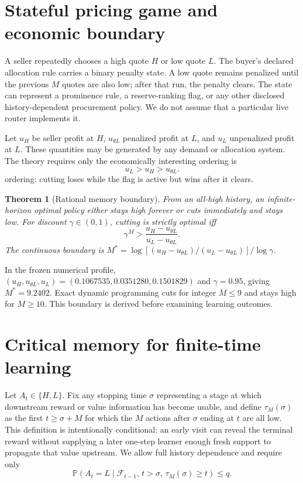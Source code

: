 \documentclass[10pt,twocolumn]{article}
\newtheorem{theorem}{Theorem}
\newcommand{\Prb}{\mathbb{P}}
\begin{document}
\section{Stateful pricing game and economic boundary}

A seller repeatedly chooses a high quote $H$ or low quote $L$.  The buyer's
declared allocation rule carries a binary penalty state.  A low quote remains
penalized until the previous $M$ quotes are also low; after that run, the
penalty clears.  The state can represent a prominence rule, a reserve-ranking
flag, or any other disclosed history-dependent procurement policy.  We do not
assume that a particular live router implements it.

Let $u_H$ be seller profit at $H$, $u_{\theta L}$ penalized profit at $L$, and
$u_L$ unpenalized profit at $L$.  These quantities may be generated by any
demand or allocation system.  The theory requires only the economically
interesting
ordering is
\begin{equation}
  u_L>u_H>u_{\theta L}.
  \label{eq:ordering}
\end{equation}
ordering: cutting loses while the flag is active but wins after it clears.

\begin{theorem}[Rational memory boundary]
From an all-high history, an infinite-horizon optimal policy either stays high
forever or cuts immediately and stays low.  For discount $\gamma\in(0,1)$,
cutting is strictly optimal iff
\begin{equation}
 \gamma^M>
 \frac{u_H-u_{\theta L}}{u_L-u_{\theta L}}.
 \label{eq:rational-boundary}
\end{equation}
The continuous boundary is
$M^*=\log[(u_H-u_{\theta L})/(u_L-u_{\theta L})]/\log\gamma$.
\label{thm:rational}
\end{theorem}

In the frozen numerical profile,
$(u_H,u_{\theta L},u_L)=(0.1067535,0.0351280,0.1501829)$ and
$\gamma=0.95$, giving $M^*=9.2402$.  Exact dynamic programming cuts for
integer $M\le9$ and stays high for $M\ge10$.  This boundary is derived before
examining learning outcomes.

\section{Critical memory for finite-time learning}

Let $A_t\in\{H,L\}$.  Fix any stopping time $\sigma$ representing a stage
at which downstream reward or value information has become usable, and define
$\tau_M(\sigma)$ as the first $t\ge\sigma+M$ for which the $M$ actions after
$\sigma$ ending at $t$ are all low.  This definition is intentionally
conditional: an early visit can reveal the terminal reward without supplying a
later one-step learner enough fresh support to propagate that value upstream.
We allow full history dependence and require only
\begin{equation}
 \Prb(A_t=L\mid\mathcal F_{t-1},\,t>\sigma,\,
 \tau_M(\sigma)\ge t)\le q.
 \label{eq:qcap}
\end{equation}
\end{document}
